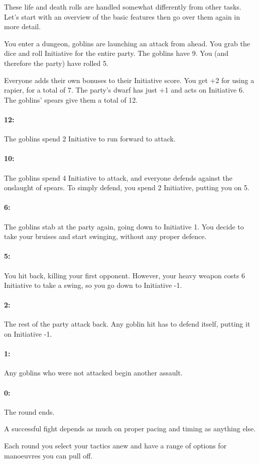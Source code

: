\documentclass[titlepage,a4paper,openany]{book}
\begin{document}
\begin{multicols}{2}

These life and death rolls are handled somewhat differently from other tasks. Let's start with an overview of the basic features then go over them again in more detail. 

You enter a dungeon, goblins are launching an attack from ahead.
You grab the dice and roll Initiative for the entire party.
The goblins have 9.
You (and therefore the party) have rolled 5.

Everyone adds their own bonuses to their Initiative score.
You get +2 for using a rapier, for a total of 7.
The party's dwarf has just +1 and acts on Initiative 6.
The goblins' spears give them a total of 12.

\paragraph{12:} The goblins spend 2 Initiative to run forward to attack.

\paragraph{10:} The goblins spend 4 Initiative to attack, and everyone defends against the onslaught of spears.
To simply defend, you spend 2 Initiative, putting you on 5.
\paragraph{6:} The goblins stab at the party again, going down to Initiative 1.
You decide to take your bruises and start swinging, without any proper defence.
\paragraph{5:} You hit back, killing your first opponent.
However, your heavy weapon costs 6 Initiative to take a swing, so you go down to Initiative -1.
\paragraph{2:} The rest of the party attack back.
Any goblin hit has to defend itself, putting it on Initiative -1.
\paragraph{1:} Any goblins who were not attacked begin another assault.
\paragraph{0:} The round ends.

A successful fight depends as much on proper pacing and timing as anything else.

Each \gls{round} you select your tactics anew and have a range of options for manoeuvres you can pull off.

\end{multicols}
\end{document}

